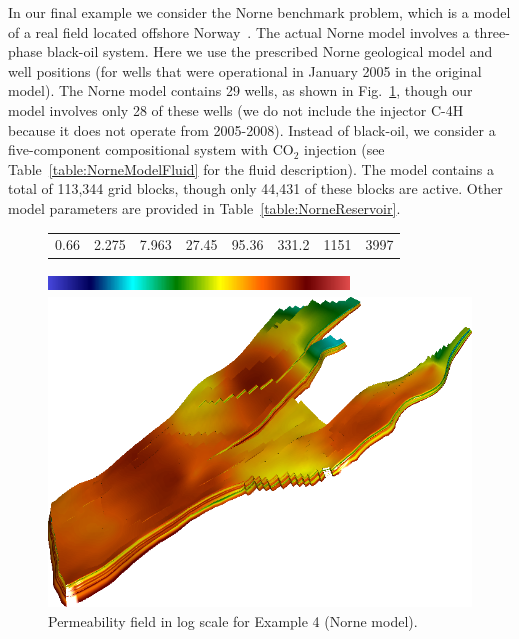 \documentclass[twocolumn,numbook]{svjour3}          %
\begin{document}
In our final example we consider the Norne benchmark problem, which is a model
of a real field located offshore Norway~\cite{NorneWebsite}. The actual Norne
model involves a three-phase black-oil system. Here we use the prescribed Norne
geological model and well positions (for wells that were operational in January 2005 in the original model). The Norne model
contains 29 wells, as shown in Fig.~\ref{fig:NorneModelAndWells}, though our
model involves only 28 of these wells (we do not include the injector C-4H
because it does not operate from 2005-2008). Instead of
black-oil, we consider a five-component compositional system with CO$_2$
injection (see Table~\ref{table:NorneModelFluid} for the fluid description). The
model contains a total of 113,344 grid blocks, though only 44,431 of these
blocks are active.  Other model parameters are provided in
Table~\ref{table:NorneReservoir}.


\begin{figure}[ht]
     \begin{center}
     \begin{tabular}{cccccccc}
      0.66 & 2.275 & 7.963 & 27.45 & 95.36 & 331.2 & 1151 & 3997
      \end{tabular}
       \includegraphics[width=8cm, height=0.5cm]{VanEssenModelPermeabilityMapColorBar.png}
       
       \medskip
      
       \includegraphics[totalheight=5cm]{NorneModelPermeabilityMap.png}
     \end{center}
     \caption{Permeability field in log scale for Example 4 (Norne model).}
  \label{fig:NorneModelAndWells}
\end{figure}
\end{document}
